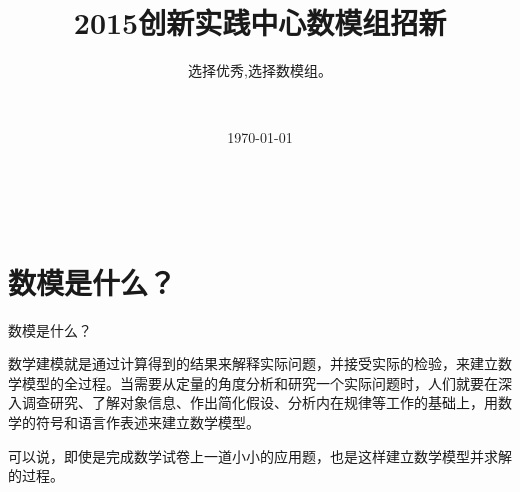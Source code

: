 \documentclass{beamer}
\title[数模组(MCM)]{2015创新实践中心数模组招新} %
\subtitle{选择优秀,选择数模组。}
\author[C103]{\faWeibo \href{http://weibo.com/301yangzhou}{ \faAt{身经百战的扬州人形}}\\} %
\institute[DLUT] %
{
\faInstitution 大连理工大学软件学院 \faMapMarker 教学楼C区103 \\ %
\faEnvelope{ } \href{mailto:cippusmcm@163.com}{\textit{cippusmcm@163.com}}
\faRenren{} \href{http://www.renren.com/344749467/}{数模组} %
}
\date{\today} %
\begin{document}
\linespread{1}
{
	\begin{frame}[plain]
		  \vspace{13em}
		  			\begin{titleBox}
		  				{\centering{\LARGE \inserttitle\\ {{\large \insertsubtitle}}}\\
		  					
		  				}
		  				\insertinstitute \faCalendarCheckO{ }\insertdate
		  			\end{titleBox}
	\end{frame}
}

\section{数模是什么？}
\begin{frame}{数模是什么？}
\begin{exampleblock}{}
数学建模就是通过计算得到的结果来解释实际问题，并接受实际的检验，来建立数学模型的全过程。当需要从定量的角度分析和研究一个实际问题时，人们就要在深入调查研究、了解对象信息、作出简化假设、分析内在规律等工作的基础上，用数学的符号和语言作表述来建立数学模型。 
\end{exampleblock}
\vspace{.5cm}
\begin{alertblock}{}
可以说，即使是完成数学试卷上一道小小的应用题，也是这样建立数学模型并求解的过程。
\end{alertblock} 
\end{frame}
\end{document}
